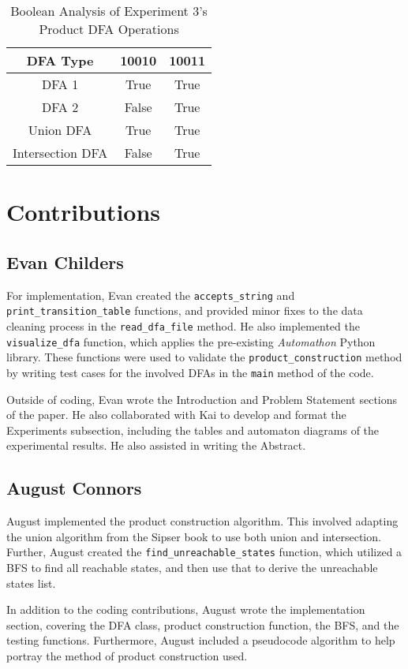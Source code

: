 \documentclass[conference]{IEEEtran}
\begin{document}
\begin{table}[h!]
\centering
\caption{Boolean Analysis of Experiment 3's Product DFA Operations}
\label{table-exp3-dfabool}
\begin{tabular}{|c|c|c|}
\hline
\textbf{DFA Type} & \textbf{10010} & \textbf{10011} \\ \hline
DFA 1 & True & True \\ \hline
DFA 2 & False & True \\ \hline
Union DFA & True & True \\ \hline
Intersection DFA & False & True \\ \hline
\end{tabular}
\end{table} 

\section{Contributions}
\subsection{Evan Childers}
For implementation, Evan created the \texttt{accepts\_string} and \texttt{print\_transition\_table} functions, and provided minor fixes to the data cleaning process in the \texttt{read\_dfa\_file} method. He also implemented the \texttt{visualize\_dfa} function, which applies the pre-existing \textit{Automathon} Python library. These functions were used to validate the \texttt{product\_construction} method by writing test cases for the involved DFAs in the \texttt{main} method of the code.

Outside of coding, Evan wrote the Introduction and Problem Statement sections of the paper. He also collaborated with Kai to develop and format the Experiments subsection, including the tables and automaton diagrams of the experimental results. He also assisted in writing the Abstract.

\subsection{August Connors}
August implemented the product construction algorithm. This involved adapting the union algorithm from the Sipser book to use both union and intersection. Further, August created the \texttt{find\_unreachable\_states} function, which utilized a BFS to find all reachable states, and then use that to derive the unreachable states list.

In addition to the coding contributions, August wrote the implementation section, covering the DFA class, product construction function, the BFS, and the testing functions. Furthermore, August included a pseudocode algorithm to help portray the method of product construction used.
\end{document}
